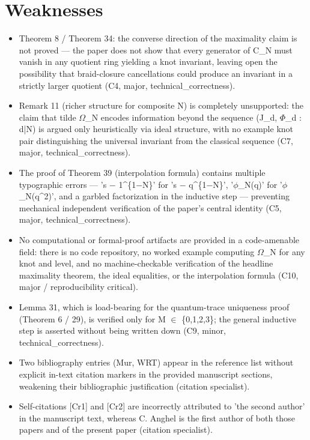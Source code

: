 \documentclass[11pt]{article}
\begin{document}
\section*{Weaknesses}
\begin{itemize}[leftmargin=*]
  \item Theorem 8 / Theorem 34: the converse direction of the maximality claim is not proved --- the paper does not show that every generator of C\_N must vanish in any quotient ring yielding a knot invariant, leaving open the possibility that braid-closure cancellations could produce an invariant in a strictly larger quotient (C4, major, technical\_correctness).
  \item Remark 11 (richer structure for composite N) is completely unsupported: the claim that tilde \ensuremath{\Omega}\_N encodes information beyond the sequence (J\_d, \ensuremath{\Phi}\_d : d|N) is argued only heuristically via ideal structure, with no example knot pair distinguishing the universal invariant from the classical sequence (C7, major, technical\_correctness).
  \item The proof of Theorem 39 (interpolation formula) contains multiple typographic errors --- 's \ensuremath{-} 1\^{}\{1\ensuremath{-}N\}' for 's \ensuremath{-} q\^{}\{1\ensuremath{-}N\}', '\ensuremath{\phi}\_N(q)' for '\ensuremath{\phi}\_N(q\^{}2)', and a garbled factorization in the inductive step --- preventing mechanical independent verification of the paper's central identity (C5, major, technical\_correctness).
  \item No computational or formal-proof artifacts are provided in a code-amenable field: there is no code repository, no worked example computing \ensuremath{\Omega}\_N for any knot and level, and no machine-checkable verification of the headline maximality theorem, the ideal equalities, or the interpolation formula (C10, major / reproducibility critical).
  \item Lemma 31, which is load-bearing for the quantum-trace uniqueness proof (Theorem 6 / 29), is verified only for M \ensuremath{\in} \{0,1,2,3\}; the general inductive step is asserted without being written down (C9, minor, technical\_correctness).
  \item Two bibliography entries (Mur, WRT) appear in the reference list without explicit in-text citation markers in the provided manuscript sections, weakening their bibliographic justification (citation specialist).
  \item Self-citations [Cr1] and [Cr2] are incorrectly attributed to 'the second author' in the manuscript text, whereas C. Anghel is the first author of both those papers and of the present paper (citation specialist).
\end{itemize}
\end{document}

